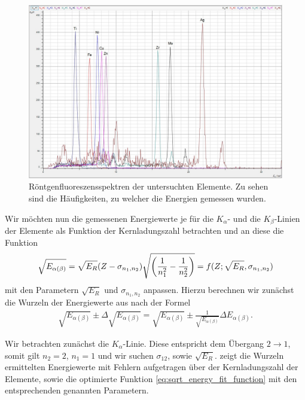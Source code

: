 \begin{figure}[H]
  \centering
  \includegraphics[width=\textwidth]{files/elemente_metalle.jpg}
  \caption{Röntgenfluoreszensspektren der untersuchten Elemente. Zu sehen sind die Häufigkeiten, zu welcher die Energien gemessen wurden.}
  \label{fig:elemente_metalle}
\end{figure}
\newpage\noindent
Wir möchten nun die gemessenen Energiewerte je für die $K_{\alpha}$- und die $K_{\beta}$-Linien der Elemente als Funktion der Kernladungszahl betrachten und an diese die Funktion
\begin{align}
  \sqrt{E_{\alpha(\beta)}} = \sqrt{E_R} (Z - \sigma_{n_1, n_2}) \sqrt{\qty(\frac{1}{n_1^2} - \frac{1}{n_2^2})} = f(Z; \sqrt{E_R}, \sigma_{n_1, n_2})\label{eq:sqrt_energy_fit_function}
\end{align}
mit den Parametern $\sqrt{E_R}$ und $\sigma_{n_1, n_2}$ anpassen. Hierzu berechnen wir zunächst die Wurzeln der Energiewerte aus  nach der Formel
\begin{align}
  \sqrt{E_{\alpha(\beta)}} \pm \Delta \sqrt{E_{\alpha(\beta)}} = \sqrt{E_{\alpha(\beta)}} \pm \frac{1}{\sqrt{E_{\alpha(\beta)}}} \Delta E_{\alpha(\beta)}.
\end{align}

Wir betrachten zunächst die $K_{\alpha}$-Linie. Diese entspricht dem Übergang $2 \to 1$, somit gilt $n_2 = 2$, $n_1 = 1$ und wir suchen $\sigma_{12}$, sowie $\sqrt{E_R}$.  zeigt die Wurzeln ermittelten Energiewerte mit Fehlern aufgetragen über der Kernladungszahl der Elemente, sowie die optimierte Funktion \eqref{eq:sqrt_energy_fit_function} mit den entsprechenden genannten Parametern.

